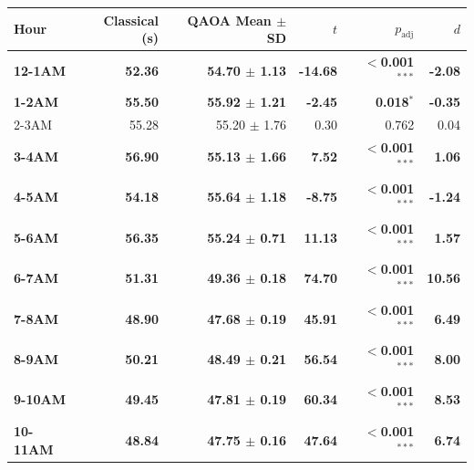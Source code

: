 \documentclass[12pt]{article}
\begin{document}
\begin{table}[H]
\centering

\begin{tabular}{lrrrrr}
\toprule
Hour & Classical (s) & QAOA Mean $\pm$ SD & $t$ & $p_{\text{adj}}$ & $d$ \\
\midrule
{\boldmath\bfseries 12-1AM} & {\boldmath\bfseries 52.36} & {\boldmath\bfseries 54.70 $\pm$ 1.13} & {\boldmath\bfseries -14.68} & {\boldmath\bfseries $<$0.001$^{***}$} & {\boldmath\bfseries -2.08} \\
{\boldmath\bfseries 1-2AM} & {\boldmath\bfseries 55.50} & {\boldmath\bfseries 55.92 $\pm$ 1.21} & {\boldmath\bfseries -2.45} & {\boldmath\bfseries 0.018$^{*}$} & {\boldmath\bfseries -0.35} \\
2-3AM & 55.28 & 55.20 $\pm$ 1.76 & 0.30 & 0.762 & 0.04 \\
{\boldmath\bfseries 3-4AM} & {\boldmath\bfseries 56.90} & {\boldmath\bfseries 55.13 $\pm$ 1.66} & {\boldmath\bfseries 7.52} & {\boldmath\bfseries $<$0.001$^{***}$} & {\boldmath\bfseries 1.06} \\
{\boldmath\bfseries 4-5AM} & {\boldmath\bfseries 54.18} & {\boldmath\bfseries 55.64 $\pm$ 1.18} & {\boldmath\bfseries -8.75} & {\boldmath\bfseries $<$0.001$^{***}$} & {\boldmath\bfseries -1.24} \\
{\boldmath\bfseries 5-6AM} & {\boldmath\bfseries 56.35} & {\boldmath\bfseries 55.24 $\pm$ 0.71} & {\boldmath\bfseries 11.13} & {\boldmath\bfseries $<$0.001$^{***}$} & {\boldmath\bfseries 1.57} \\
{\boldmath\bfseries 6-7AM} & {\boldmath\bfseries 51.31} & {\boldmath\bfseries 49.36 $\pm$ 0.18} & {\boldmath\bfseries 74.70} & {\boldmath\bfseries $<$0.001$^{***}$} & {\boldmath\bfseries 10.56} \\
{\boldmath\bfseries 7-8AM} & {\boldmath\bfseries 48.90} & {\boldmath\bfseries 47.68 $\pm$ 0.19} & {\boldmath\bfseries 45.91} & {\boldmath\bfseries $<$0.001$^{***}$} & {\boldmath\bfseries 6.49} \\
{\boldmath\bfseries 8-9AM} & {\boldmath\bfseries 50.21} & {\boldmath\bfseries 48.49 $\pm$ 0.21} & {\boldmath\bfseries 56.54} & {\boldmath\bfseries $<$0.001$^{***}$} & {\boldmath\bfseries 8.00} \\
{\boldmath\bfseries 9-10AM} & {\boldmath\bfseries 49.45} & {\boldmath\bfseries 47.81 $\pm$ 0.19} & {\boldmath\bfseries 60.34} & {\boldmath\bfseries $<$0.001$^{***}$} & {\boldmath\bfseries 8.53} \\
{\boldmath\bfseries 10-11AM} & {\boldmath\bfseries 48.84} & {\boldmath\bfseries 47.75 $\pm$ 0.16} & {\boldmath\bfseries 47.64} & {\boldmath\bfseries $<$0.001$^{***}$} & {\boldmath\bfseries 6.74} \\

\end{tabular}
\end{table}
\end{document}
